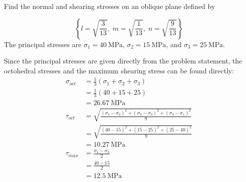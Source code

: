 \section{}
Find the normal and shearing stresses on an oblique plane defined by

\begin{equation*}
    \left\{
        l = \sqrt{\frac{3}{13}},\;
        m = \sqrt{\frac{1}{13}},\;
        n = \sqrt{\frac{9}{13}}
    \right\}
\end{equation*}
The principal stresses are $\sigma_1 = \qty{40}{\mega\pascal}$, $\sigma_2 = \qty{15}{\mega\pascal}$, and $\sigma_3 = \qty{25}{\mega\pascal}$.

Since the principal stresses are given directly from the problem statement, the octohedral stresses and the maximum shearing stress can be found directly:
\begin{align*}
    \sigma_{oct} &= \frac{1}{3}(\sigma_1 + \sigma_2 + \sigma_3) \\
    &= \frac{1}{3}(40 + 15 + 25) \\
    &= \boxed{\qty{26.67}{\mega\pascal}} \\
    \tau_{oct} &= \sqrt{\frac{(\sigma_1 - \sigma_2)^2 + (\sigma_2 - \sigma_3)^2 + (\sigma_3 - \sigma_1)^2}{9}} \\
    &= \sqrt{\frac{(40 - 15)^2 + (15 - 25)^2 + (25 - 40)^2}{9}} \\
    &= \boxed{\qty{10.27}{\mega\pascal}} \\
    \tau_{max} &= \frac{\sigma_1 - \sigma_2}{2} \\
    &= \frac{40 - 15}{2} \\
    &= \boxed{\qty{12.5}{\mega\pascal}}
\end{align*}
